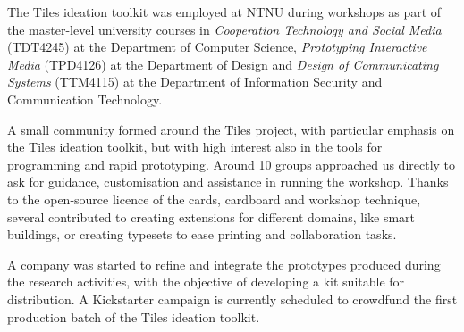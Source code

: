 The Tiles ideation toolkit was employed at NTNU during workshops as part of the master-level university courses in \textit{Cooperation Technology and Social Media} (TDT4245) at the Department of Computer Science, \textit{Prototyping Interactive Media} (TPD4126) at the Department of Design and \textit{Design of Communicating Systems} (TTM4115) at the Department of Information Security and Communication Technology.

A small community formed around the Tiles project, with particular emphasis on the Tiles ideation toolkit, but with high interest also in the tools for programming and rapid prototyping. Around 10 groups approached us directly to ask for guidance, customisation and assistance in running the workshop. Thanks to the open-source licence of the cards, cardboard and workshop technique, several contributed to creating extensions for different domains, like smart buildings, or creating typesets to ease printing and collaboration tasks.

A company was started to refine and integrate the prototypes produced during the research activities, with the objective of developing a kit suitable for distribution.
A Kickstarter campaign is currently scheduled to crowdfund the first production batch of the Tiles ideation toolkit.
